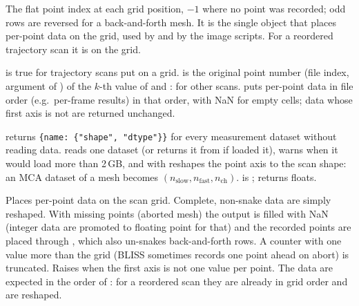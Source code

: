 The flat point index at each grid position, $-1$ where no point was recorded; odd rows are
reversed for a back-and-forth mesh. It is the single object that places per-point data on
the grid, used by  and by the image scripts.
For a reordered trajectory scan it is  on the grid.

 is true for trajectory scans put on a grid.  is the
original point number (file index, argument of ) of the $k$-th value of
 and :  for other scans. 
puts per-point data in file order (e.g.\ per-frame results) in that order, with NaN for empty
cells; data whose first axis is not  are returned unchanged.

 returns \texttt{\{name: \{"shape", "dtype"\}\}} for every
measurement dataset without reading data.  reads one dataset (or returns it from
 if  loaded it), warns when it would load more than 2\,GB, and
with  reshapes the point axis to the scan shape: an MCA dataset of a mesh
becomes $(n_\mathrm{slow}, n_\mathrm{fast}, n_\mathrm{ch})$.  is
;  returns floats.

Places per-point data on the scan grid. Complete, non-snake data are simply reshaped. With
missing points (aborted mesh) the output is filled with NaN (integer data are promoted to
floating point for that) and the recorded points are placed through , which
also un-snakes back-and-forth rows. A counter with one value more than the grid (BLISS
sometimes records one point ahead on abort) is truncated. Raises  when the
first axis is not one value per point. The data are expected in the order of :
for a reordered scan they are already in grid order and are reshaped.


